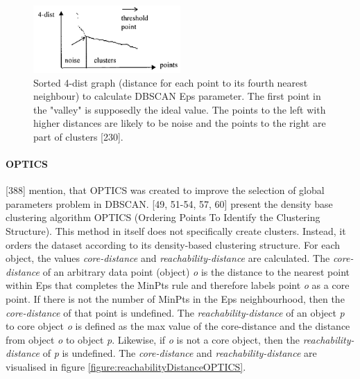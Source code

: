 \begin{figure}[h]
  \centering
  \includegraphics[width=0.5\textwidth]{./images/sortedKGraphDBSCAN.png}
  \caption{Sorted 4-dist graph (distance for each point to its fourth nearest neighbour) to calculate DBSCAN Eps parameter. The first point in the "valley" is supposedly the ideal value. The points to the left with higher distances are likely to be noise and the points to the right are part of clusters \autocite{DBSCAN}[230].}
  \label{figure:sortedKGraphDBSCAN}
\end{figure}




\paragraph{OPTICS}
\label{section:OPTICS}
\textcite{han2011data}[388] mention, that OPTICS was created to improve the selection of global parameters problem in DBSCAN.
\textcite{OPTICS}[49, 51-54, 57, 60] present the density base clustering algorithm OPTICS (Ordering Points To Identify the Clustering Structure). This method in itself does not specifically create clusters. Instead, it orders the dataset according to its density-based clustering structure. For each object, the values \textit{core-distance} and \textit{reachability-distance} are calculated. The \textit{core-distance} of an arbitrary data point (object) \textit{o} is the distance to the nearest point within Eps that completes the MinPts rule and therefore labels point \textit{o} as a core point. If there is not the number of MinPts in the Eps neighbourhood, then the \textit{core-distance} of that point is undefined. The \textit{reachability-distance} of an object \textit{p} to core object \textit{o} is defined as the max value of the core-distance and the distance from object \textit{o} to object \textit{p}. Likewise, if \textit{o} is not a core object, then the \textit{reachability-distance} of \textit{p} is undefined. The \textit{core-distance} and \textit{reachability-distance} are visualised in figure \ref{figure:reachabilityDistanceOPTICS}.


